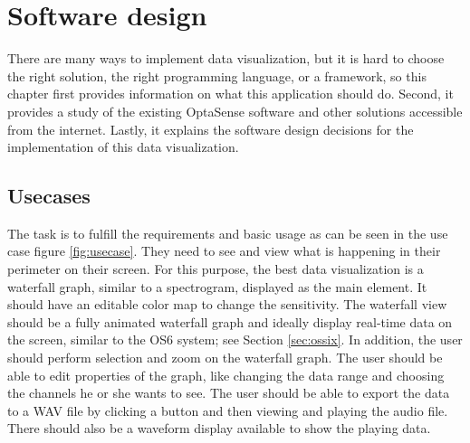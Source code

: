 \newpage

\section{Software design}


There are many ways to implement data visualization, but it is hard to choose the right solution, the right programming language, or a framework, so this chapter first provides information on what this application should do. Second, it provides a study of the existing OptaSense software and other solutions accessible from the internet. Lastly, it explains the software design decisions for the implementation of this data visualization.

\subsection{Usecases}\label{lab:usecases}

The task is to fulfill the requirements and basic usage as can be seen in the use case figure \ref{fig:usecase}. They need to see and view what is happening in their perimeter on their screen. For this purpose, the best data visualization is a waterfall graph, similar to a spectrogram, displayed as the main element. It should have an editable color map to change the sensitivity. The waterfall view should be a fully animated waterfall graph and ideally display real-time data on the screen, similar to the OS6 system; see Section \ref{sec:ossix}. In addition, the user should perform selection and zoom on the waterfall graph. The user should be able to edit properties of the graph, like changing the data range and choosing the channels he or she wants to see. The user should be able to export the data to a WAV file by clicking a button and then viewing and playing the audio file. There should also be a waveform display available to show the playing data.

